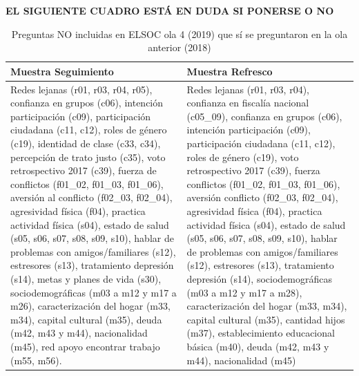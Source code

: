 \documentclass[
]{book}
\begin{document}
\textbf{EL SIGUIENTE CUADRO ESTÁ EN DUDA SI PONERSE O NO}

\begin{table}[H]

\caption{\label{tab:noincluidas}\label{tab:difcuest} Preguntas NO incluidas en ELSOC ola 4  (2019) que sí se preguntaron en la ola anterior (2018)}
\centering
\begin{tabular}[t]{>{\raggedright\arraybackslash}p{6cm}>{\raggedright\arraybackslash}p{6cm}}
\toprule
Muestra Seguimiento & Muestra Refresco\\
\midrule
Redes lejanas (r01, r03, r04, r05), confianza en grupos (c06), intención participación (c09), participación ciudadana (c11, c12), roles de género (c19), identidad de clase (c33, c34), percepción de trato justo (c35), voto retrospectivo 2017 (c39), fuerza de conflictos (f01\_02, f01\_03, f01\_06), aversión al conflicto (f02\_03, f02\_04), agresividad física (f04), practica actividad física (s04), estado de salud (s05, s06, s07, s08, s09, s10), hablar de problemas con amigos/familiares (s12), estresores (s13), tratamiento depresión (s14), metas y planes de vida (s30), sociodemográficas (m03 a m12 y m17 a m26), caracterización del hogar (m33, m34), capital cultural (m35), deuda (m42, m43 y m44), nacionalidad (m45), red apoyo encontrar trabajo (m55, m56). & Redes lejanas (r01, r03, r04), confianza en fiscalía nacional (c05\_09), confianza en grupos (c06), intención participación (c09), participación ciudadana (c11, c12), roles de género (c19), voto retrospectivo 2017 (c39), fuerza conflictos (f01\_02, f01\_03, f01\_06), aversión conflicto (f02\_03, f02\_04), agresividad física (f04), practica actividad física (s04), estado de salud (s05, s06, s07, s08, s09, s10), hablar de problemas con amigos/familiares (s12), estresores (s13), tratamiento depresión (s14), sociodemográficas (m03 a m12 y m17 a m28), caracterización del hogar (m33, m34), capital cultural (m35), cantidad hijos (m37), establecimiento educacional básica (m40), deuda (m42, m43 y m44), nacionalidad (m45)\\
\bottomrule
\end{tabular}
\end{table}
\end{document}
